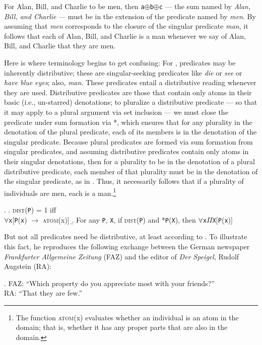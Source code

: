 \documentclass[linguex]{sp}
\renewcommand{\tt}{\texttt}
\newcommand{\op}{$\oplus$}
\begin{document}
For Alan, Bill, and Charlie to be men, then \tt{a}\op\tt{b}\op\tt{c} --- the sum named by \emph{Alan, Bill, and Charlie} --- must be in the extension of the predicate named by \emph{men}. By assuming that \emph{men} corresponds to the closure of the singular predicate \emph{man}, it follows that each of Alan, Bill, and Charlie is a man whenever we say of Alan, Bill, and Charlie that they are men.

Here is where terminology begins to get confusing: For \citeauthor{link1983}, predicates may be inherently distributive; these are singular-seeking predicates like \emph{die} or \emph{see} or \emph{have blue eyes}; also, \emph{man}. These predicates entail a distributive reading whenever they are used.
Distributive predicates are those that contain only atoms in their basic (i.e., un-starred) denotations; to pluralize a distributive predicate --- so that it may apply to a plural argument via set inclusion --- we must close the predicate under sum formation via *, which ensures that for any plurality in the denotation of the plural predicate, each of its members is in the denotation of the singular predicate. Because plural predicates are formed via sum formation from singular predicates, and assuming distributive predicates contain only atoms in their singular denotations, then for a plurality to be in the denotation of a plural distributive predicate, each member of that plurality must be in the denotation of the singular predicate, as in \Next. Thus, it necessarily follows that if a plurality of individuals are men, each is a man.\footnote{The function \textsc{atom}(x) evaluates whether an individual is an atom in the domain; that is, whether it has any proper parts that are also in the domain.}

\ex. \a. \textsc{dist}(\texttt{P}) = 1 iff\\
$\forall$\texttt{x}[\texttt{P}(\texttt{x}) $\rightarrow$ \textsc{atom}(x)]
\b. For any \texttt{P}, \texttt{X}, if \textsc{dist}(\texttt{P}) and *\texttt{P}(\texttt{X}), then
$\forall$\texttt{x}$\Pi$\texttt{X}[\texttt{P}(\texttt{x})]


But not all predicates need be distributive, at least according to \citeauthor{link1983}. To illustrate this fact, he reproduces the following exchange between the German newspaper \emph{Frankfurter Allgemeine Zeitung} (FAZ) and the editor of \emph{Der Speigel}, Rudolf Augstein (RA): 

\ex. FAZ: ``Which property do you appreciate most with your friends?''\\
RA: ``That they are few.''
\end{document}
